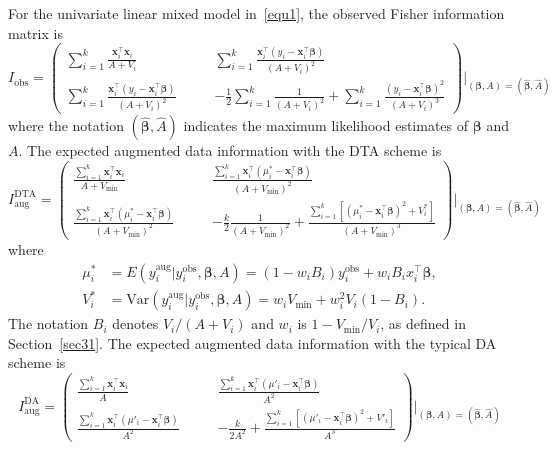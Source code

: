 \documentclass[12pt]{article}
\begin{document}
For the univariate linear mixed model in~\eqref{equ1}, the observed Fisher information matrix is
$$
I_{\textrm{obs}}=
\left( \begin{array}{ccc}
\sum_{i=1}^k \frac{\boldsymbol{x}^{\top}_i\boldsymbol{x}_i}{A+V_i} &~~~~~ &\sum_{i=1}^k \frac{\boldsymbol{x}^{\top}_i(y_i-\boldsymbol{x}^{\top}_i\boldsymbol{\beta})}{(A+V_i)^2} \\
\sum_{i=1}^k \frac{\boldsymbol{x}^{\top}_i(y_i-\boldsymbol{x}^{\top}_i\boldsymbol{\beta})}{(A+V_i)^2} && -\frac{1}{2}\sum_{i=1}^k \frac{1}{(A+V_i)^2}+\sum_{i=1}^k \frac{(y_i-\boldsymbol{x}^{\top}_i\boldsymbol{\beta})^2}{(A+V_i)^3}
\end{array} \right)\bigg\vert_{(\boldsymbol{\beta}, A)=(\hat{\boldsymbol{\beta}}, \hat{A})}
$$
where the notation $(\hat{\boldsymbol{\beta}}, \hat{A})$ indicates the maximum likelihood estimates of $\boldsymbol{\beta}$ and $A$. The expected augmented data information with the  DTA scheme is 
$$
I^{\textrm{DTA}}_{\textrm{aug}}=
\left( \begin{array}{ccc}
\frac{\sum_{i=1}^k\boldsymbol{x}^{\top}_i\boldsymbol{x}_i}{A+V_{\textrm{min}}} &~~~~~ & \frac{\sum_{i=1}^k\boldsymbol{x}^{\top}_i(\mu^\ast_i-\boldsymbol{x}^{\top}_i\boldsymbol{\beta})}{(A+V_{\textrm{min}})^2} \\
  \frac{\sum_{i=1}^k\boldsymbol{x}^{\top}_i(\mu^\ast_i-\boldsymbol{x}^{\top}_i\boldsymbol{\beta})}{(A+V_{\textrm{min}})^2}  && -\frac{k}{2} \frac{1}{(A+V_{\textrm{min}})^2}+ \frac{\sum_{i=1}^k[(\mu^\ast_i-\boldsymbol{x}^{\top}_i\boldsymbol{\beta})^2+V^\ast_i]}{(A+V_{\textrm{min}})^3}
\end{array} \right)\bigg\vert_{(\boldsymbol{\beta}, A)=(\hat{\boldsymbol{\beta}}, \hat{A})}
$$
where %
\begin{align}
\mu^\ast_i&=E(y_i^{\textrm{aug}}\vert y_i^{\textrm{obs}}, \boldsymbol{\beta}, A)=(1-w_iB_i) y^{\textrm{obs}}_i+w_iB_ix^\top_i\boldsymbol{\beta},\nonumber\\
V^\ast_i&=\textrm{Var}(y_i^{\textrm{aug}}\vert y_i^{\textrm{obs}}, \boldsymbol{\beta}, A)=w_iV_{\textrm{min}}+w_i^2V_i(1-B_i).\nonumber
\end{align}
The notation $B_i$ denotes $V_i / (A+V_i)$ and $w_i$ is $1 - V_{\textrm{min}}/V_i$, as defined in Section~\ref{sec31}. The expected augmented data information with the typical DA scheme is 
$$
I^{\textrm{DA}}_{\textrm{aug}}=
\left( \begin{array}{ccc}
\frac{\sum_{i=1}^k\boldsymbol{x}^{\top}_i\boldsymbol{x}_i}{A} &~~~~~ & \frac{\sum_{i=1}^k\boldsymbol{x}^{\top}_i(\mu'_i-\boldsymbol{x}^{\top}_i\boldsymbol{\beta})}{A^2} \\
  \frac{\sum_{i=1}^k\boldsymbol{x}^{\top}_i(\mu'_i-\boldsymbol{x}^{\top}_i\boldsymbol{\beta})}{A^2}  && -\frac{k}{2A^2} + \frac{\sum_{i=1}^k[(\mu'_i-\boldsymbol{x}^{\top}_i\boldsymbol{\beta})^2+V'_i]}{A^3}
\end{array} \right)\bigg\vert_{(\boldsymbol{\beta}, A)=(\hat{\boldsymbol{\beta}}, \hat{A})}
$$
\end{document}
